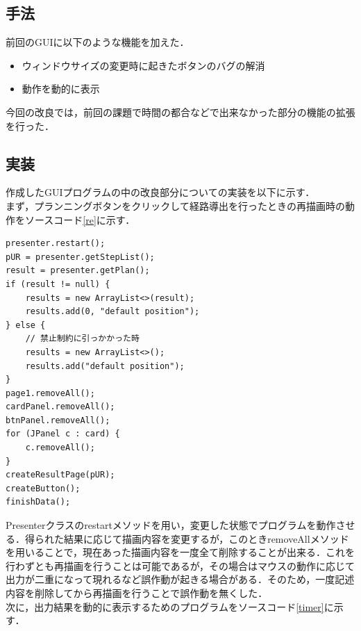 \documentclass[12pt]{jarticle}
\begin{document}
\subsection{手法}
前回のGUIに以下のような機能を加えた．

\begin{itemize}
\item ウィンドウサイズの変更時に起きたボタンのバグの解消
\item 動作を動的に表示

\end{itemize}

今回の改良では，前回の課題で時間の都合などで出来なかった部分の機能の拡張を行った．

\subsection{実装}
作成したGUIプログラムの中の改良部分についての実装を以下に示す．\\

まず，プランニングボタンをクリックして経路導出を行ったときの再描画時の動作をソースコード\ref{re}に示す．\\

\begin{lstlisting}[caption=再描画時の動作,label=re]
presenter.restart();
pUR = presenter.getStepList();
result = presenter.getPlan();
if (result != null) {
	results = new ArrayList<>(result);
	results.add(0, "default position");
} else {
	// 禁止制約に引っかかった時
	results = new ArrayList<>();
	results.add("default position");
}
page1.removeAll();
cardPanel.removeAll();
btnPanel.removeAll();
for (JPanel c : card) {
	c.removeAll();
}
createResultPage(pUR);
createButton();
finishData();
\end{lstlisting}

Presenterクラスのrestartメソッドを用い，変更した状態でプログラムを動作させる．得られた結果に応じて描画内容を変更するが，このときremoveAllメソッドを用いることで，現在あった描画内容を一度全て削除することが出来る．これを行わずとも再描画を行うことは可能であるが，その場合はマウスの動作に応じて出力が二重になって現れるなど誤作動が起きる場合がある．そのため，一度記述内容を削除してから再描画を行うことで誤作動を無くした．\\

次に，出力結果を動的に表示するためのプログラムをソースコード\ref{timer}に示す．\\
\end{document}
